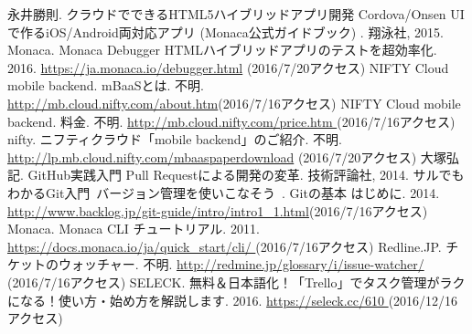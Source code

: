 \documentclass[openany,11pt,papersize]{jsbook}
\begin{document}
%
\maketitle

\frontmatter



\tableofcontents%


\mainmatter%



%









%





\begin{appendix}







\end{appendix}



\begin{thebibliography}{10}
 永井勝則. クラウドでできるHTML5ハイブリッドアプリ開発 Cordova/Onsen UIで作るiOS/Android両対応アプリ (Monaca公式ガイドブック) . 翔泳社, 2015.
 Monaca. Monaca Debugger HTMLハイブリッドアプリのテストを超効率化. 2016. \url{https://ja.monaca.io/debugger.html} (2016/7/20アクセス)
 NIFTY Cloud mobile backend. mBaaSとは. 不明. \url{http://mb.cloud.nifty.com/about.htm}(2016/7/16アクセス)
 NIFTY Cloud mobile backend. 料金. 不明. \url{http://mb.cloud.nifty.com/price.htm }(2016/7/16アクセス)
 nifty. ニフティクラウド「mobile backend」のご紹介. 不明. \url{http://lp.mb.cloud.nifty.com/mbaaspaperdownload} (2016/7/20アクセス)
 大塚弘記. GitHub実践入門 Pull Requestによる開発の変革. 技術評論社, 2014.
 サルでもわかるGit入門~バージョン管理を使いこなそう~. Gitの基本 はじめに. 2014. \url{http://www.backlog.jp/git-guide/intro/intro1_1.html}(2016/7/16アクセス)
 Monaca. Monaca CLI チュートリアル. 2011. \url{https://docs.monaca.io/ja/quick_start/cli/ }(2016/7/16アクセス)
 Redline.JP. チケットのウォッチャー. 不明. \url{http://redmine.jp/glossary/i/issue-watcher/ }(2016/7/16アクセス)
 SELECK. 無料＆日本語化！「Trello」でタスク管理がラクになる！使い方・始め方を解説します. 2016. \url{https://seleck.cc/610 }(2016/12/16アクセス)
\end{thebibliography}
\end{document}
